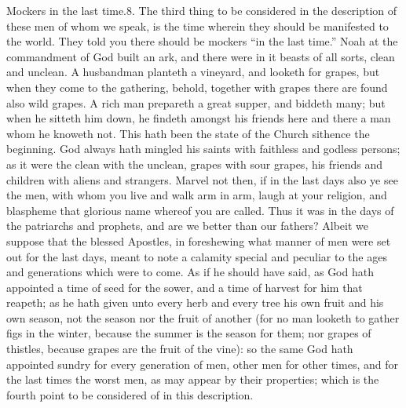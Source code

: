 Mockers in the last time.8. The third thing to be considered in the description of these men of whom we speak, is the time wherein they should be manifested to the world. They told you there should be mockers “in the last time.” Noah at the commandment of God built an ark, and there were in it beasts of all sorts, clean and unclean. A husbandman planteth a vineyard, and looketh for grapes, but when they come to the gathering, behold, together with grapes there are found also wild grapes. A rich man prepareth a great supper, and biddeth many; but when he sitteth him down, he findeth amongst his friends here and there a man whom he knoweth not. This hath been the state of the Church sithence the beginning. God always hath mingled his saints with faithless and godless persons; as it were the clean with the unclean, grapes with sour grapes, his friends and children with aliens and strangers. Marvel not then, if in the last days also ye see the men, with whom you live and walk arm in arm, laugh at your religion, and blaspheme that glorious name whereof you are called. Thus it was in the days of the patriarchs and prophets, and are we better than our fathers? Albeit we suppose that the blessed Apostles, in foreshewing what manner of men were set out for the last days, meant to note a calamity special and peculiar to the ages and generations which were to come. As if he should have said, as God hath appointed a time of seed for the sower, and a time of harvest for him that reapeth; as he hath given unto every herb and every tree his own fruit and his own season, not the season nor the fruit of another (for no man looketh to gather figs in the winter, because the summer is the season for them; nor grapes of thistles, because grapes are the fruit of the vine): so the same God hath appointed sundry for every generation of men, other men for other times, and for the last times the worst men, as may appear by their properties; which is the fourth point to be considered of in this description.

